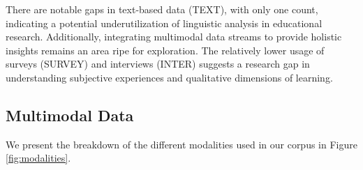 \documentclass[manuscript,screen,review]{acmart}
\begin{document}
There are notable gaps in text-based data (TEXT), with only one count, indicating a potential underutilization of linguistic analysis in educational research. Additionally, integrating multimodal data streams to provide holistic insights remains an area ripe for exploration. The relatively lower usage of surveys (SURVEY) and interviews (INTER) suggests a research gap in understanding subjective experiences and qualitative dimensions of learning.


\subsection{Multimodal Data}
We present the breakdown of the different modalities used in our corpus in Figure \ref{fig:modalities}.
\end{document}
